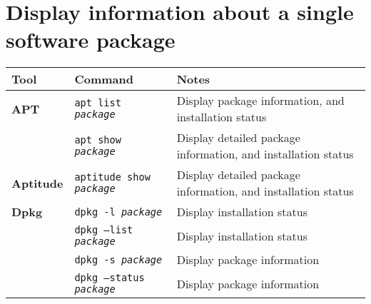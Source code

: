 \documentclass[10pt]{article}
\begin{document}
\section{Display information about a single software package}
\begin{tabular}{ p{3.5cm} p{9cm} p{11cm}}
  \hline
  \rowcolor{Gray}
  \textbf{Tool} & \textbf{Command} & \textbf{Notes} \\
  \hline 
  \textbf{APT} & \texttt{apt list \textit{package}} & Display package information, and installation status \\
  \rowcolor{Gray}
  & \texttt{apt show \textit{package}} & Display detailed package information, and installation status \\
  \textbf{Aptitude} & \texttt{aptitude show \textit{package}} &  Display detailed package information, and installation status \\
  \textbf{Dpkg} & \texttt{dpkg -l \textit{package} } & Display installation status \\
  \rowcolor{Gray}
  & \texttt{dpkg --list \textit{package} } & Display installation status \\
  & \texttt{dpkg -s \textit{package} } & Display package information\\
  \rowcolor{Gray}
  & \texttt{dpkg --status \textit{package} } & Display package information \\
  \hline
\end{tabular}

\newpage

\cheatsheet
\end{document}
